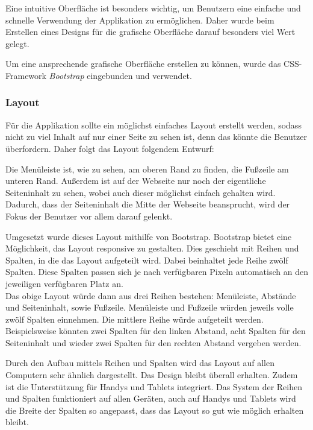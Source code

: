 
Eine intuitive Oberfläche ist besonders wichtig, um Benutzern eine einfache und schnelle Verwendung der Applikation zu ermöglichen. Daher wurde beim Erstellen eines Designs für die grafische Oberfläche darauf besonders viel Wert gelegt.

Um eine ansprechende grafische Oberfläche erstellen zu können, wurde das CSS-Framework \textit{Bootstrap} eingebunden und verwendet.

\subsubsection{Layout}
Für die Applikation sollte ein möglichst einfaches Layout erstellt werden, sodass nicht zu viel Inhalt auf nur einer Seite zu sehen ist, denn das könnte die Benutzer überfordern. Daher folgt das Layout folgendem Entwurf:


Die Menüleiste ist, wie zu sehen, am oberen Rand zu finden, die Fußzeile am unteren Rand. Außerdem ist auf der Webseite nur noch der eigentliche Seiteninhalt zu sehen, wobei auch dieser möglichst einfach gehalten wird. Dadurch, dass der Seiteninhalt die Mitte der Webseite beansprucht, wird der Fokus der Benutzer vor allem darauf gelenkt.

\newpage

Umgesetzt wurde dieses Layout mithilfe von Bootstrap. Bootstrap bietet eine Möglichkeit, das Layout responsive zu gestalten. Dies geschieht mit Reihen und Spalten, in die das Layout aufgeteilt wird. Dabei beinhaltet jede Reihe zwölf Spalten. Diese Spalten passen sich je nach verfügbaren Pixeln automatisch an den jeweiligen verfügbaren Platz an.\\
Das obige Layout würde dann aus drei Reihen bestehen: Menüleiste, Abstände und Seiteninhalt, sowie Fußzeile. Menüleiste und Fußzeile würden jeweils volle zwölf Spalten einnehmen. Die mittlere Reihe würde aufgeteilt werden. Beispielsweise könnten zwei Spalten für den linken Abstand, acht Spalten für den Seiteninhalt und wieder zwei Spalten für den rechten Abstand vergeben werden.

Durch den Aufbau mittels Reihen und Spalten wird das Layout auf allen Computern sehr ähnlich dargestellt. Das Design bleibt überall erhalten. Zudem ist die Unterstützung für Handys und Tablets integriert. Das System der Reihen und Spalten funktioniert auf allen Geräten, auch auf Handys und Tablets wird die Breite der Spalten so angepasst, dass das Layout so gut wie möglich erhalten bleibt.


